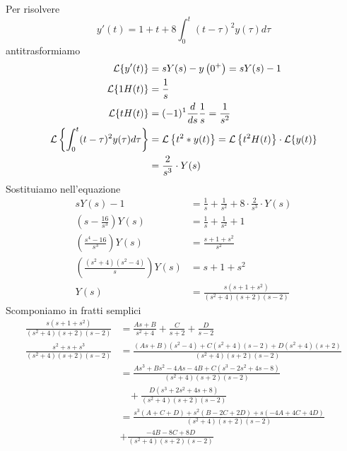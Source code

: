 Per risolvere
\begin{equation*}
y'(t) = 1 + t + 8\int^{t}_{0}(t - \tau)^{2} y(\tau) d\tau 
\end{equation*}
antitrasformiamo
\begin{align*}
\mathcal{L}\{y'(t)\} & = sY(s) - y\left(0^{+}\right) = sY(s) - 1\\
\mathcal{L}\{1H(t)\} & = \frac{1}{s}\\
\mathcal{L}\{tH(t)\} & = (- 1)^{1}\frac{d}{ds}\frac{1}{s} = \frac{1}{s^{2}}\\
\mathcal{L}\left\{\int^{t}_{0}(t - \tau)^{2} y(\tau) d\tau \right\} & = \mathcal{L}\left\{t^{2} *y(t)\right\} = \mathcal{L}\left\{t^{2} H(t)\right\} \cdot \mathcal{L}\{y(t)\}\\
 & = \frac{2}{s^{3}} \cdot Y(s)
\end{align*}
Sostituiamo nell'equazione
\begin{align*}
sY(s) - 1 & = \frac{1}{s} + \frac{1}{s^{2}} + 8 \cdot \frac{2}{s^{3}} \cdot Y(s)\\
\left(s - \frac{16}{s^{3}}\right) Y(s) & = \frac{1}{s} + \frac{1}{s^{2}} + 1\\
\left(\frac{s^{4} - 16}{s^{3}}\right) Y(s) & = \frac{s + 1 + s^{2}}{s^{2}}\\
\left(\frac{\left(s^{2} + 4\right)\left(s^{2} - 4\right)}{s}\right) Y(s) & = s + 1 + s^{2}\\
Y(s) & = \frac{s\left(s + 1 + s^{2}\right)}{\left(s^{2} + 4\right)(s + 2)(s - 2)}
\end{align*}
Scomponiamo in fratti semplici
\begin{align*}
\frac{s\left(s + 1 + s^{2}\right)}{\left(s^{2} + 4\right)(s + 2)(s - 2)} & = \frac{As + B}{s^{2} + 4} + \frac{C}{s + 2} + \frac{D}{s - 2}\\
\frac{s^{2} + s + s^{3}}{\left(s^{2} + 4\right)(s + 2)(s - 2)} & = \frac{(As + B)\left(s^{2} - 4\right) + C\left(s^{2} + 4\right)(s - 2) + D\left(s^{2} + 4\right)(s + 2)}{\left(s^{2} + 4\right)(s + 2)(s - 2)}\\
 & = \frac{As^{3} + Bs^{2} - 4As - 4B + C\left(s^{3} - 2s^{2} + 4s - 8\right)}{\left(s^{2} + 4\right)(s + 2)(s - 2)}\\
 & \ \ \ \ + \frac{D\left(s^{3} + 2s^{2} + 4s + 8\right)}{\left(s^{2} + 4\right)(s + 2)(s - 2)}\\
 & = \frac{s^{3}(A + C + D) + s^{2}(B - 2C + 2D) + s(- 4A + 4C + 4D)}{\left(s^{2} + 4\right)(s + 2)(s - 2)}\\
 & + \frac{- 4B - 8C + 8D}{\left(s^{2} + 4\right)(s + 2)(s - 2)}
\end{align*}
